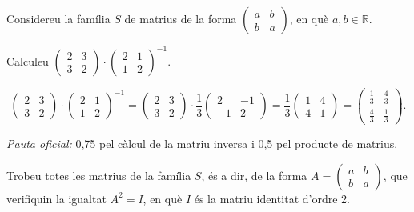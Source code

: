 Considereu la família $S$ de matrius de la forma $\begin{pmatrix}a&b\\b&a\end{pmatrix}$, en què $a,b\in\mathbb{R}$.

\begin{apartats}

Calculeu $\begin{pmatrix}2&3\\3&2\end{pmatrix}\cdot\begin{pmatrix}2&1\\1&2\end{pmatrix}^{-1}$.

\begin{solucio}
\[
\begin{pmatrix}2&3\\3&2\end{pmatrix}\cdot\begin{pmatrix}2&1\\1&2\end{pmatrix}^{-1}
=\begin{pmatrix}2&3\\3&2\end{pmatrix}\cdot\frac13\begin{pmatrix}2&-1\\-1&2\end{pmatrix}
=\frac13\begin{pmatrix}1&4\\4&1\end{pmatrix}=\begin{pmatrix}\frac13&\frac43\\[3pt]\frac43&\frac13\end{pmatrix}.
\]

\textit{Pauta oficial:} 0,75 pel càlcul de la matriu inversa i 0,5 pel producte de matrius.
\end{solucio}

Trobeu totes les matrius de la família $S$, és a dir, de la forma $A=\begin{pmatrix}a&b\\b&a\end{pmatrix}$, que verifiquin
la igualtat $A^2=I$, en què $I$ és la matriu identitat d'ordre 2.


\end{apartats}
